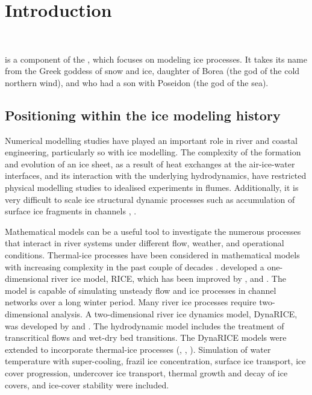  \renewcommand{\labelitemi}{$\rhd$}

\chapter{Introduction}

~\newline

\khione is a component of the \telemacsystem{}, which focuses on modeling ice processes.
It takes its name from the Greek goddess of snow and ice, daughter of Borea (the god of the cold northern wind), and who had a son with Poseidon (the god of the sea).

\section{Positioning \khione within the ice modeling history}

Numerical modelling studies have played an important role in river and coastal engineering, particularly so with ice modelling. The complexity of the formation and evolution of an ice sheet, as a result of heat exchanges at the  air-ice-water interfaces, and its interaction with the underlying hydrodynamics, have restricted physical modelling studies to idealised experiments in flumes. Additionally, it is very difficult to scale ice structural dynamic processes such as accumulation of surface ice fragments in channels \cite{Kennedy1981}, \cite{ashton1986river}.\newline

Mathematical models can be a useful tool to investigate the numerous processes that interact in river systems under different flow, weather, and operational conditions. Thermal-ice processes have been considered in mathematical models with increasing complexity in the past couple of decades \cite{shen2010mathematical}. \cite{lal1991mathematical} developed a one-dimensional river ice model, RICE, which has been improved by \cite{shen1995numerical}, and \cite{kandamby2010numerical}. The model is capable of simulating unsteady flow and ice processes in channel networks over a long winter period. Many river ice processes require two-dimensional analysis. A two-dimensional river ice dynamics model, DynaRICE, was developed by \cite{shen2000sph} and \cite{liu2003two}. The hydrodynamic model includes the treatment of transcritical flows and wet-dry bed transitions. The DynaRICE models were extended to incorporate thermal-ice processes (\cite{liu2006two}, \cite{shen2010mathematical}, \cite{huang2012modeling}). Simulation of water temperature with super-cooling, frazil ice concentration, surface ice transport, ice cover progression, undercover ice transport, thermal growth and decay of ice covers, and ice-cover stability were included.\newline

